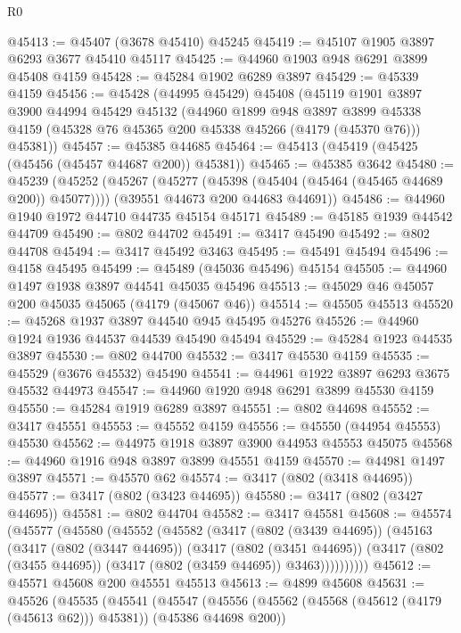 \begin{lexlean}{R0}
\begin{coremodule}
@45413 := @45407 (@3678 @45410) @45245
@45419 := @45107 @1905 @3897 @6293 @3677 @45410 @45117
@45425 := @44960 @1903 @948 @6291 @3899 @45408 @4159
@45428 := @45284 @1902 @6289 @3897
@45429 := @45339 @4159
@45456 := @45428
    (@44995 @45429)
    @45408
    (@45119
      @1901
      @3897
      @3900
      @44994
      @45429
      @45132
      (@44960
        @1899
        @948
        @3897
        @3899
        @45338
        @4159
        (@45328 @76 @45365 @200 @45338 @45266 (@4179 (@45370 @76)))
        @45381))
@45457 := @45385 @44685
@45464 := @45413 (@45419 (@45425 (@45456 (@45457 @44687 @200)) @45381))
@45465 := @45385 @3642
@45480 := @45239
    (@45252
      (@45267 (@45277 (@45398 (@45404 (@45464 (@45465 @44689 @200)) @45077))))
      (@39551 @44673 @200 @44683 @44691))
@45486 := @44960 @1940 @1972 @44710 @44735 @45154 @45171
@45489 := @45185 @1939 @44542 @44709
@45490 := @802 @44702
@45491 := @3417 @45490
@45492 := @802 @44708
@45494 := @3417 @45492 @3463
@45495 := @45491 @45494
@45496 := @4158 @45495
@45499 := @45489 (@45036 @45496) @45154
@45505 := @44960 @1497 @1938 @3897 @44541 @45035 @45496
@45513 := @45029 @46 @45057 @200 @45035 @45065 (@4179 (@45067 @46))
@45514 := @45505 @45513
@45520 := @45268 @1937 @3897 @44540 @945 @45495 @45276
@45526 := @44960 @1924 @1936 @44537 @44539 @45490 @45494
@45529 := @45284 @1923 @44535 @3897
@45530 := @802 @44700
@45532 := @3417 @45530 @4159
@45535 := @45529 (@3676 @45532) @45490
@45541 := @44961 @1922 @3897 @6293 @3675 @45532 @44973
@45547 := @44960 @1920 @948 @6291 @3899 @45530 @4159
@45550 := @45284 @1919 @6289 @3897
@45551 := @802 @44698
@45552 := @3417 @45551
@45553 := @45552 @4159
@45556 := @45550 (@44954 @45553) @45530
@45562 := @44975 @1918 @3897 @3900 @44953 @45553 @45075
@45568 := @44960 @1916 @948 @3897 @3899 @45551 @4159
@45570 := @44981 @1497 @3897
@45571 := @45570 @62
@45574 := @3417 (@802 (@3418 @44695))
@45577 := @3417 (@802 (@3423 @44695))
@45580 := @3417 (@802 (@3427 @44695))
@45581 := @802 @44704
@45582 := @3417 @45581
@45608 := @45574
    (@45577
      (@45580
        (@45552
          (@45582
            (@3417
              (@802 (@3439 @44695))
              (@45163
                (@3417
                  (@802 (@3447 @44695))
                  (@3417
                    (@802 (@3451 @44695))
                    (@3417 (@802 (@3455 @44695)) (@3417 (@802 (@3459 @44695)) @3463))))))))))
@45612 := @45571 @45608 @200 @45551 @45513
@45613 := @4899 @45608
@45631 := @45526
    (@45535
      (@45541
        (@45547
          (@45556 (@45562 (@45568 (@45612 (@4179 (@45613 @62))) @45381)) (@45386 @44698 @200))

\end{coremodule}
\end{lexlean}
